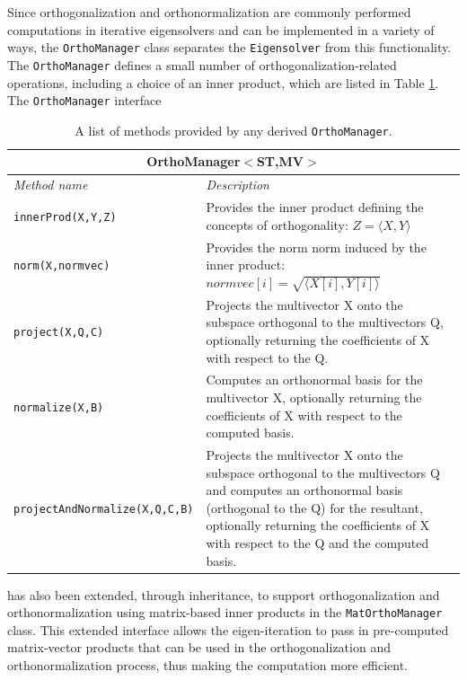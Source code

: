 \documentclass[acmtoms]{acmtrans2m}
\newcommand{\aspace}[1]{\texttt{#1}}
\begin{document}
Since orthogonalization and orthonormalization are commonly performed
computations in iterative eigensolvers and can be implemented in a variety of ways, 
the \aspace{OrthoManager} class separates the \aspace{Eigensolver}
from this functionality. The \aspace{OrthoManager} defines a small number of
orthogonalization-related operations, including a choice of an inner
product, which are listed in Table \ref{tab:anasazi:orthomanager}.  The \aspace{OrthoManager} interface
\begin{table}[htp]
\begin{center}
\caption{A list of methods provided by any derived \aspace{OrthoManager}.} 
\label{tab:anasazi:orthomanager}
\begin{tabular}{| p{4cm} | p{6cm} |}
\hline
\multicolumn{2}{|c|}{\textbf{OrthoManager$<$ST,MV$>$}} \\\hline
\emph{Method name} & \emph{Description} \\
\hline
{\tt innerProd(X,Y,Z)} &
Provides the inner product defining the concepts of orthogonality: $Z = \langle X, Y \rangle$ \\
{\tt norm(X,normvec)} &
Provides the norm norm induced by the inner product: $normvec[i] = \sqrt{\langle X[i], Y[i] \rangle}$\\
{\tt project(X,Q,C) } &
Projects the multivector X onto the subspace orthogonal to the multivectors Q, optionally returning the coefficients of 
X with respect to the Q.\\
{\tt normalize(X,B)} &
Computes an orthonormal basis for the multivector X, optionally returning the coefficients
of X with respect to the computed basis.\\
{\tt projectAndNormalize(X,Q,C,B)} &
Projects the multivector X onto the subspace orthogonal to the multivectors Q and computes an orthonormal basis (orthogonal to the Q) 
for the resultant, optionally returning the coefficients of X with respect to the Q and the computed basis.\\
\hline
\end{tabular}
\end{center}
\end{table}
has also been extended, through inheritance, to support orthogonalization and 
orthonormalization using matrix-based inner products in the \aspace{MatOrthoManager}
class. This extended interface allows the eigen-iteration to pass in pre-computed
matrix-vector products that can be used in the orthogonalization and orthonormalization
process, thus making the computation more efficient.
\end{document}
